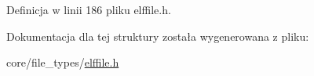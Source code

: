 Definicja w linii 186 pliku elffile.\-h.



Dokumentacja dla tej struktury została wygenerowana z pliku\-:\begin{DoxyCompactItemize}
\item 
core/file\-\_\-types/\hyperlink{elffile_8h}{elffile.\-h}\end{DoxyCompactItemize}
